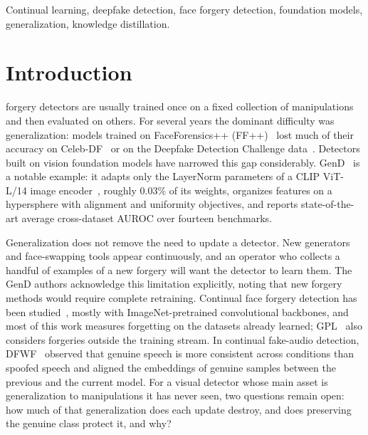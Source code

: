 \documentclass{ieeeaccess}
\newcommand{\ffpp}{FF{+}{+}}
\begin{document}
\begin{keywords}
Continual learning, deepfake detection, face forgery detection, foundation models, generalization, knowledge distillation.
\end{keywords}

\titlepgskip=-21pt

\maketitle

\section{Introduction}

 forgery detectors are usually trained once on a fixed collection of manipulations and then evaluated on others. For several years the dominant difficulty was generalization: models trained on FaceForensics++ (\ffpp{})~\cite{rossler2019faceforensics} lost much of their accuracy on Celeb-DF~\cite{li2020celebdf} or on the Deepfake Detection Challenge data~\cite{dolhansky2019dfdcpreview}. Detectors built on vision foundation models have narrowed this gap considerably. GenD~\cite{yermakov2026gend} is a notable example: it adapts only the LayerNorm parameters of a CLIP ViT-L/14 image encoder~\cite{radford2021clip}, roughly 0.03\% of its weights, organizes features on a hypersphere with alignment and uniformity objectives, and reports state-of-the-art average cross-dataset AUROC over fourteen benchmarks.

Generalization does not remove the need to update a detector. New generators and face-swapping tools appear continuously, and an operator who collects a handful of examples of a new forgery will want the detector to learn them. The GenD authors acknowledge this limitation explicitly, noting that new forgery methods would require complete retraining. Continual face forgery detection has been studied~\cite{kim2021cored,pan2023dfil,zhang2025gpl}, mostly with ImageNet-pretrained convolutional backbones, and most of this work measures forgetting on the datasets already learned; GPL~\cite{zhang2025gpl} also considers forgeries outside the training stream. In continual fake-audio detection, DFWF~\cite{ma2021dfwf} observed that genuine speech is more consistent across conditions than spoofed speech and aligned the embeddings of genuine samples between the previous and the current model. For a visual detector whose main asset is generalization to manipulations it has never seen, two questions remain open: how much of that generalization does each update destroy, and does preserving the genuine class protect it, and why?
\end{document}
